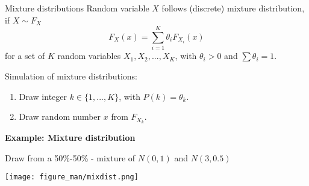 \documentclass[11pt,compress,t,notes=noshow, xcolor=table]{beamer}
\begin{document}
\begin{vbframe}{Mixture distributions}
Random variable $X$ follows (discrete) mixture distribution, if $X \sim F_X$
$$
F_X(x) = \sum_{i=1}^K \theta_i F_{X_i}(x)
$$
for a set of $K$ random variables $X_1, X_2, ..., X_K$, with $\theta_i >0$ and $\sum\theta_i=1$.

\lz

Simulation of mixture distributions:
\begin{enumerate}
\item Draw integer $k \in \{1,...,K\}$, with $P(k)=\theta_k$.
\item Draw random number $x$ from $F_{X_k}$.
\end{enumerate}

\framebreak

\textbf{Example: Mixture distribution}

\lz

Draw from a 50\%-50\% - mixture of $N(0,1)$ and $N(3,0.5)$


\begin{center}
\texttt{[image: figure\_man/mixdist.png]}
\end{center}



\end{vbframe}
\end{document}
